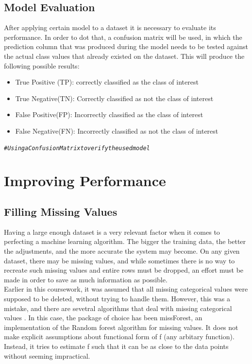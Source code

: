 \documentclass[a4paper,12pt]{article}\usepackage[]{graphicx}\usepackage[]{color}
\makeatletter
\newcommand{\hlcom}[1]{\textcolor[rgb]{0.678,0.584,0.686}{\textit{#1}}}%
\newenvironment{kframe}{%
 \def\at@end@of@kframe{}%
 \ifinner\ifhmode%
  \def\at@end@of@kframe{\end{minipage}}%
  \begin{minipage}{\columnwidth}%
 \fi\fi%
 \def\FrameCommand##1{\hskip\@totalleftmargin \hskip-\fboxsep
 \colorbox{shadecolor}{##1}\hskip-\fboxsep
     \hskip-\linewidth \hskip-\@totalleftmargin \hskip\columnwidth}%
 \MakeFramed {\advance\hsize-\width
   \@totalleftmargin\z@ \linewidth\hsize
   \@setminipage}}%
 {\par\unskip\endMakeFramed%
 \at@end@of@kframe}
\newenvironment{knitrout}{}{} %
\makeatother
\begin{document}
\subsection{Model Evaluation}\label{evaluation}
After applying certain model to a dataset it is necessary to evaluate its performance. In order to dot that, a confusion matrix will be used, in which the prediction column that was produced during the model needs to be tested against the actual class values that already existed on the dataset. This will produce the following possible results:
\begin{itemize}
  \item True Positive (TP): correctly classified as the class of interest
  \item True Negative(TN): Correctly classified as not the class of interest
  \item False Positive(FP): Incorrectly classified as the class of interest
  \item False Negative(FN): Incorrectly classified as not the class of interest
\end{itemize}

\begin{knitrout}
\color{fgcolor}\begin{kframe}
\begin{alltt}
\hlcom{# Using a Confusion Matrix to verify the used model}
\end{alltt}
\end{kframe}
\end{knitrout}

\clearpage

\section{Improving Performance}\label{improving_performance}

\subsection{Filling Missing Values}\label{filling_missing}
Having a large enough dataset is a very relevant factor when it comes to perfecting a machine learning algorithm. The bigger the training data, the better the adjustments, and the more accurate the system may become. On any given dataset, there may be missing values, and while sometimes there is no way to recreate such missing values and entire rows must be dropped, an effort must be made in order to save as much information as possible.\\
Earlier in this coursework, it was assumed that all missing categorical values were supposed to be deleted, without trying to handle them. However, this was a mistake, and there are sevetral algorithms that deal with missing categorical values \cite{mekala_2019}. In this case, the package of choice has been missForest, an implementation of the Random forest algorithm for missing values. It does not make explicit assumptions about functional form of f (any arbitary function). Instead, it tries to estimate f such that it can be as close to the data points without seeming impractical.
\end{document}
